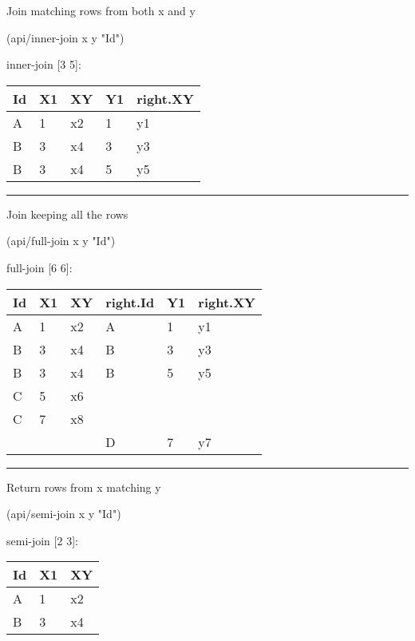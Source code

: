 \documentclass[]{article}
\newenvironment{Shaded}{\begin{snugshade}}{\end{snugshade}}
\newcommand{\NormalTok}[1]{#1}
\newcommand{\StringTok}[1]{\textcolor[rgb]{0.31,0.60,0.02}{#1}}
\begin{document}
Join matching rows from both x and y

\begin{Shaded}
\begin{Highlighting}[]
\NormalTok{(api/inner-join x y }\StringTok{"Id"}\NormalTok{)}
\end{Highlighting}
\end{Shaded}

inner-join {[}3 5{]}:

\begin{longtable}[]{@{}lllll@{}}
\toprule
Id & X1 & XY & Y1 & right.XY\tabularnewline
\midrule
\endhead
A & 1 & x2 & 1 & y1\tabularnewline
B & 3 & x4 & 3 & y3\tabularnewline
B & 3 & x4 & 5 & y5\tabularnewline
\bottomrule
\end{longtable}

\begin{center}\rule{0.5\linewidth}{0.5pt}\end{center}

Join keeping all the rows

\begin{Shaded}
\begin{Highlighting}[]
\NormalTok{(api/full-join x y }\StringTok{"Id"}\NormalTok{)}
\end{Highlighting}
\end{Shaded}

full-join {[}6 6{]}:

\begin{longtable}[]{@{}llllll@{}}
\toprule
Id & X1 & XY & right.Id & Y1 & right.XY\tabularnewline
\midrule
\endhead
A & 1 & x2 & A & 1 & y1\tabularnewline
B & 3 & x4 & B & 3 & y3\tabularnewline
B & 3 & x4 & B & 5 & y5\tabularnewline
C & 5 & x6 & & &\tabularnewline
C & 7 & x8 & & &\tabularnewline
& & & D & 7 & y7\tabularnewline
\bottomrule
\end{longtable}

\begin{center}\rule{0.5\linewidth}{0.5pt}\end{center}

Return rows from x matching y

\begin{Shaded}
\begin{Highlighting}[]
\NormalTok{(api/semi-join x y }\StringTok{"Id"}\NormalTok{)}
\end{Highlighting}
\end{Shaded}

semi-join {[}2 3{]}:

\begin{longtable}[]{@{}lll@{}}
\toprule
Id & X1 & XY\tabularnewline
\midrule
\endhead
A & 1 & x2\tabularnewline
B & 3 & x4\tabularnewline
\bottomrule
\end{longtable}
\end{document}
